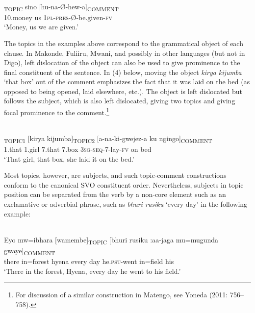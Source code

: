 \documentclass[output=paper]{langsci/langscibook}
\begin{document}
\ea\label{ex:}
\\
\gll [Pesa]\textsubscript{TOPIC} sino [hu-na-Ø-hew-a]\textsubscript{COMMENT}\\
10.money us \textsc{1pl-pres}{}-Ø-be.given-\textsc{fv} \\


\glt \textup{‘}\textup{Money, us we are given.’}
\z

The topics in the examples above correspond to the grammatical object of each clause. In Makonde, Fuliiru, Mwani, and possibly in other languages (but not in Digo), left dislocation of the object can also be used to give prominence to the final constituent of the sentence. In (4) below, moving the object \textit{kirya kijumba} ‘that box’ out of the comment emphasizes the fact that it was laid on the bed (as opposed to being opened, laid elsewhere, etc.). The object is left dislocated but follows the subject, which is also left dislocated, giving two topics and giving focal prominence to the comment.\footnote{For discussion of a similar construction in Matengo, see Yoneda (2011: 756–758).}

\ea\label{ex:}
\\
\textsubscript{TOPIC1} [kirya kijumba]\textsubscript{TOPIC2} [a-na-ki-gwejez-a ku ngingo]\textsubscript{COMMENT}\\
1.that 1.girl 7.that 7.box \textsc{3sg-seq}{}-7-lay-\textsc{fv }on bed\\


\glt \textup{‘}\textup{That girl, that box, she laid it on the bed.’}
\z

Most topics, however, are subjects, and such topic-comment constructions conform to the canonical SVO constituent order. Nevertheless, subjects in topic position can be separated from the verb by a non-core element such as an exclamative or adverbial phrase, such as \textit{bhuri rusiku} ‘every day’ in the following example:

\ea\label{ex:}
\\
\gll Eyo mw=ibhara [wamembe]\textsubscript{TOPIC} [bhuri rusiku :aa-jaga\footnotemark{}\textsuperscript{ }mu=mugunda gwaye]\textsubscript{COMMENT}\\
there in=forest hyena every  day he.\textsc{pst}{}-went in=field his{\rmfnm}\\


\glt \textup{‘}\textup{There in the forest, Hyena, every day he went to his field.’}
\z
\end{document}

